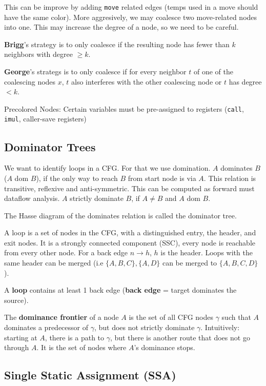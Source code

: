 This can be improve by adding \texttt{move} related edges (temps used in a move should have the same color). More aggresively, we may coalesce two move-related nodes into one. This may increase the degree of a node, so we need to be careful. \medskip

\textbf{Brigg}'s strategy is to only coalesce if the resulting node has fewer than $k$ neighbors with degree $\geq k$. \medskip

\textbf{George}'s strategs is to only coalesce if for every neighbor $t$ of one of the coalescing nodes $x$, $t$ also interferes with the other coalescing node or $t$ has degree $< k$.\medskip

Precolored Nodes: Certain variables must be pre-assigned to registers (\texttt{call}, \texttt{imul}, caller-save registers)



\subsection*{Dominator Trees}

We want to identify loops in a CFG. For that we use domination. $A$ dominates $B$ ($A$ dom $B$), if the only way to reach $B$ from start node is via $A$. This relation is transitive, reflexive and anti-symmetric. This can be computed as forward must dataflow analysis. $A$ strictly dominate $B$, if $A \neq B$ and $A$ dom $B$.\medskip

The Hasse diagram of the dominates relation is called the dominator tree.\medskip

A loop is a set of nodes in the CFG, with a distinguished entry, the header, and exit nodes.
It is a strongly connected component (SSC), every node is reachable from every other node.
For a back edge $n \rightarrow h$, $h$ is the header. Loops with the same header can be merged (i.e $\{A,B,C\}, \{A,D\}$ can be merged to $\{A,B,C,D\}$). \medskip

A \textbf{loop} contains at least 1 back edge (\textbf{back edge} = target dominates the source).\medskip

The \textbf{dominance frontier} of a node $A$ is the set of all CFG nodes $\gamma$ such that $A$ dominates a predecessor of $\gamma$, but does not strictly dominate $\gamma$. Intuitively: starting at $A$, there is a path to $\gamma$, but there is another route that does not go through $A$. It is the set of nodes where $A$'s dominance stops.


\subsection*{Single Static Assignment (SSA)}

